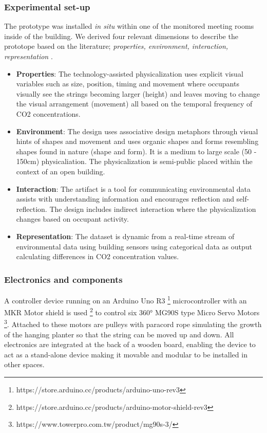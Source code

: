\subsubsection{Experimental set-up}

The prototype was installed \textit{in situ} within one of the monitored meeting rooms inside of the building. We derived four relevant dimensions to describe the prototope based on the literature; \textit{properties, environment, interaction, representation} \cite{sauve_physecology_2022, hornecker_design_2023, anhalt_university_germany_design_2022}.

\begin{itemize}
  \item \textbf{Properties}: The technology-assisted physicalization uses explicit visual variables such as size, position, timing and movement where occupants visually see the strings becoming larger (height) and leaves moving to change the visual arrangement (movement) all based on the temporal frequency of CO2 concentrations.
  \item \textbf{Environment}: The design uses associative design metaphors through visual hints of shapes and movement and uses organic shapes and forms resembling shapes found in nature (shape and form). It is a medium to large scale (50 - 150cm) physicaliation. The physicalization is semi-public placed within the context of an open building.
  \item \textbf{Interaction}: The artifact is a tool for communicating environmental data assists with understanding information and encourages reflection and self-reflection. The design includes indirect interaction where the physicalization changes based on occupant activity.
  \item \textbf{Representation}: The dataset is dynamic from a real-time stream of environmental data using building sensors using categorical data as output calculating differences in CO2 concentration values.
\end{itemize}

\subsubsection{Electronics and components}

A controller device running on an Arduino Uno R3 \footnote{https://store.arduino.cc/products/arduino-uno-rev3} microcontroller with an MKR Motor shield is used \footnote{https://store.arduino.cc/products/arduino-motor-shield-rev3} to control six 360° MG90S type Micro Servo Motors \footnote{https://www.towerpro.com.tw/product/mg90s-3/}. Attached to these motors are pulleys with paracord rope simulating the growth of the hanging planter so that the string can be moved up and down. All electronics are integrated at the back of a wooden board, enabling the device to act as a stand-alone device making it movable and modular to be installed in other spaces.


